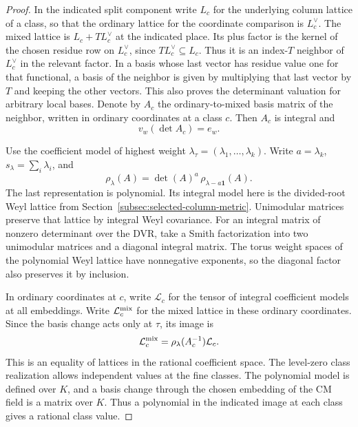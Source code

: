 \begin{proof}

In the indicated split component write \(L_c\) for the
underlying column lattice of a class, so that the
ordinary lattice for the coordinate comparison is
\(L_c^\vee\). The mixed lattice is \(L_c+T L_c^\vee\)
at the indicated place. Its plus factor is the kernel
of the chosen residue row on \(L_c^\vee\), since
\(T L_c^\vee\subseteq L_c\). Thus it is an index-\(T\)
neighbor of \(L_c^\vee\) in the relevant factor.
In a basis whose last
vector has residue value one for that functional, a
basis of the neighbor is given by multiplying that last
vector by \(T\) and keeping the other vectors. This
also proves the determinant valuation for arbitrary
local bases. Denote by \(A_c\) the ordinary-to-mixed
basis matrix of the neighbor, written in ordinary
coordinates at a class \(c\). Then \(A_c\) is integral
and 
\[
  v_w(\det A_c)=e_w.
\]


Use the coefficient model of highest weight
\(\lambda_\tau=(\lambda_1,\ldots,\lambda_k)\). Write
\(a=\lambda_k\), \(s_\lambda=\sum_i\lambda_i\), and
\[
       \rho_\lambda(A)=\det(A)^a\,\rho_{\lambda-a\boldsymbol1}(A).
\]
The last representation is polynomial. Its integral model
here is the divided-root Weyl lattice from
Section~\ref{subsec:selected-column-metric}. Unimodular
matrices preserve that lattice by integral Weyl covariance.
For an integral matrix of nonzero determinant over the DVR,
take a Smith factorization into two unimodular matrices
and a diagonal integral matrix. The torus weight spaces of
the polynomial Weyl lattice have nonnegative exponents, so
the diagonal factor also preserves it by inclusion.

In ordinary coordinates at \(c\), write \(\mathcal L_c\)
for the tensor of integral coefficient models at all
embeddings. Write \(\mathcal L_c^{\rm mix}\) for the mixed lattice in these ordinary coordinates. Since the basis change acts only at \(\tau\), its image is
\[
  \mathcal L_c^{\rm mix}=\rho_\lambda(A_c^{-1})\mathcal L_c.
\]
This is an equality of lattices in the rational coefficient
space. The level-zero class realization allows independent
values at the fine classes. The polynomial model is
defined over \(K\), and a basis change through the chosen
embedding of the CM field is a matrix over \(K\).
Thus a polynomial in the indicated image at each class
gives a rational class value.


\end{proof}
